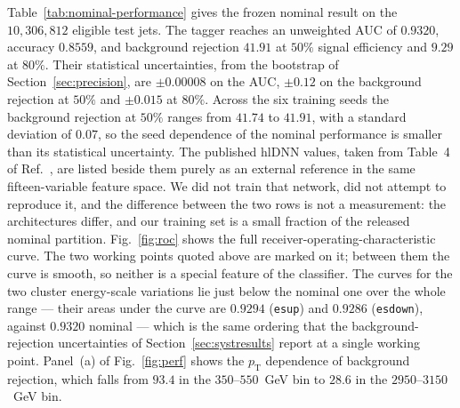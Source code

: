 \documentclass[pdflatex,sn-mathphys,Numbered,iicol]{sn-jnl}
\newcommand{\pt}{p_{\mathrm{T}}}
\begin{document}
Table~\ref{tab:nominal-performance} gives the frozen nominal result on the
$10{,}306{,}812$ eligible test jets. The tagger reaches an unweighted AUC of $0.9320$,
accuracy $0.8559$, and background rejection $41.91$ at $50\%$ signal efficiency and
$9.29$ at $80\%$. Their statistical uncertainties, from the bootstrap of
Section~\ref{sec:precision}, are $\pm 0.00008$ on the AUC, $\pm 0.12$ on the
background rejection at $50\%$ and $\pm 0.015$ at $80\%$. Across the six training seeds
the background rejection at $50\%$ ranges from $41.74$ to $41.91$, with a standard
deviation of $0.07$, so the seed dependence of the nominal performance is smaller than
its statistical uncertainty. The published hlDNN values, taken from Table~4 of
Ref.~\cite{ATLAS2024}, are listed beside them purely as an external reference in the
same fifteen-variable feature space. We did not train that
network, did not attempt to reproduce it, and the difference between the two rows is
not a measurement: the architectures differ, and our training set is a small fraction
of the released nominal partition. Fig.~\ref{fig:roc} shows the full
receiver-operating-characteristic curve. The two working points quoted above are marked
on it; between them the curve is smooth, so neither is a special feature of the
classifier. The curves for the two cluster energy-scale variations lie just below the
nominal one over the whole range --- their areas under the curve are $0.9294$
(\texttt{esup}) and $0.9286$ (\texttt{esdown}), against $0.9320$ nominal --- which is
the same ordering that the background-rejection uncertainties of
Section~\ref{sec:systresults} report at a single working point.
Panel~(a) of Fig.~\ref{fig:perf} shows the
$\pt$ dependence of background rejection, which falls from $93.4$ in the
$350$--$550$~GeV bin to $28.6$ in the $2950$--$3150$~GeV bin.


\end{document}

